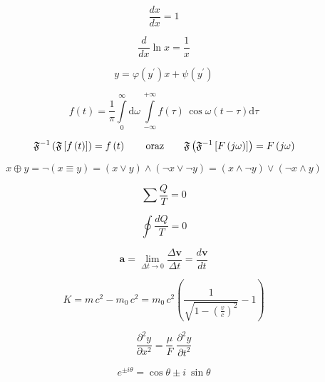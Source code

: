 \begin{equation}
    \frac{dx}{dx} = 1
\end{equation}

\begin{equation}
    \frac{d}{dx} \ln x = \frac{1}{x}
\end{equation}

\begin{equation}
    y = \varphi  (y^\prime)x + \psi(y^\prime)
\end{equation}

\begin{equation}
    f(t) = \frac{1}{\pi} \int\limits_0^\infty \mathrm{d} \omega \,\int\limits_{-\infty}^{+\infty} f(\tau)\, \cos \omega (t-\tau)  \mathrm{d}\tau
\end{equation}

\[
\mathfrak{F}^{-1}\left(\mathfrak{F} \left[ f\left(t \right ) \right ] \right ) = f \left(t \right )
\qquad \textup{oraz} \qquad
\mathfrak{F}\left(\mathfrak{F}^{-1} \left[ F\left(j\omega \right ) \right ] \right ) = F \left(j\omega \right )
\]

\begin{equation*}
    x \oplus y = \neg (x \equiv y) = (x \vee y) \wedge (\neg x \vee \neg y) = (x \wedge \neg y) \vee (\neg x \wedge y)
\end{equation*}

\begin{equation*}
    \sum \frac{Q}{T} = 0
\end{equation*}

\begin{equation}
    \oint \frac{dQ}{T} = 0
\end{equation}

\begin{equation}
    \pmb{a} = \lim\limits_{\Delta t \to 0} \frac{\Delta \pmb{v}}{\Delta t} = \frac{d\pmb{v}}{dt}
\end{equation}

\begin{equation}
K = m\,c^2 - m_0\,c^2 
 = m_0\,c^2 \left(
  \frac{1}{ \sqrt{1 - \left( \frac{v}{c} \right)^2 } } -1 
 \right)
\end{equation}

\begin{equation}
    \frac{\partial^2 y}{\partial x^2} = \frac{\mu}{F} \; \frac{\partial^2 y}{\partial t^2}
\end{equation}

\begin{equation}
    e^{\pm i\theta} = \cos \theta \pm i~\sin\theta
\end{equation}


